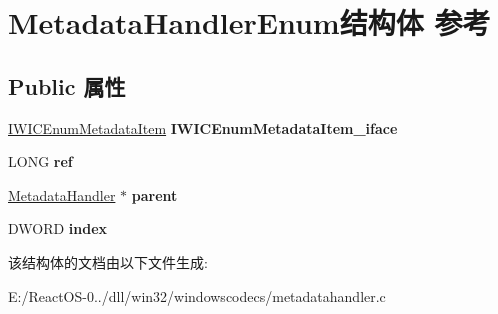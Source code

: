 \hypertarget{struct_metadata_handler_enum}{}\section{Metadata\+Handler\+Enum结构体 参考}
\label{struct_metadata_handler_enum}
\subsection*{Public 属性}
\begin{DoxyCompactItemize}
\item 
\mbox{\label{struct_metadata_handler_enum_a11d41fa9cced03d1f6c6965e60fa6d5f}} 
\hyperlink{interface_i_w_i_c_enum_metadata_item}{I\+W\+I\+C\+Enum\+Metadata\+Item} {\bfseries I\+W\+I\+C\+Enum\+Metadata\+Item\+\_\+iface}
\item 
\mbox{\label{struct_metadata_handler_enum_a455530a03de3fe29521c0feec717cda8}} 
L\+O\+NG {\bfseries ref}
\item 
\mbox{\label{struct_metadata_handler_enum_aa133276327c2f3fe815653e38a5626e3}} 
\hyperlink{struct_metadata_handler}{Metadata\+Handler} $\ast$ {\bfseries parent}
\item 
\mbox{\label{struct_metadata_handler_enum_acc7a9f5f7866a608fd956a0d488d3ff1}} 
D\+W\+O\+RD {\bfseries index}
\end{DoxyCompactItemize}


该结构体的文档由以下文件生成\+:\begin{DoxyCompactItemize}
\item 
E\+:/\+React\+O\+S-\/0../dll/win32/windowscodecs/metadatahandler.\+c\end{DoxyCompactItemize}
